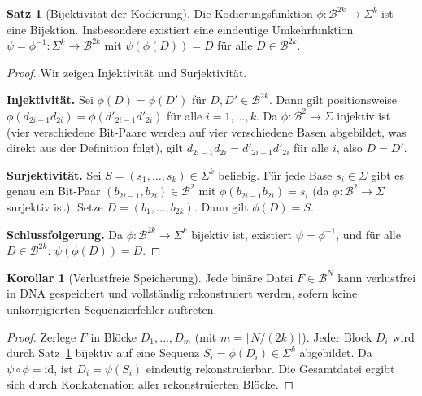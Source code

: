 ﻿\documentclass[a4paper,12pt]{article}
\theoremstyle{definition}
\newtheorem{satz}{Satz}
\newtheorem{korollar}{Korollar}
\begin{document}
\begin{satz}[Bijektivit\"{a}t der Kodierung]
    \label{satz:kodierung}
    Die Kodierungsfunktion $\phi: \mathcal{B}^{2k} \to \Sigma^k$ ist eine
    Bijektion. Insbesondere existiert eine eindeutige Umkehrfunktion
    $\psi = \phi^{-1}: \Sigma^k \to \mathcal{B}^{2k}$ mit
    $\psi(\phi(D)) = D$ f\"{u}r alle $D \in \mathcal{B}^{2k}$.
\end{satz}

\begin{proof}
    Wir zeigen Injektivit\"{a}t und Surjektivit\"{a}t.

    \textbf{Injektivit\"{a}t.}
    Sei $\phi(D) = \phi(D')$ f\"{u}r $D, D' \in \mathcal{B}^{2k}$.
    Dann gilt positionsweise $\phi(d_{2i-1} d_{2i}) = \phi(d'_{2i-1} d'_{2i})$
    f\"{u}r alle $i = 1, \ldots, k$.
    Da $\phi: \mathcal{B}^2 \to \Sigma$ injektiv ist (vier verschiedene
    Bit-Paare werden auf vier verschiedene Basen abgebildet, was direkt aus
    der Definition folgt), gilt $d_{2i-1} d_{2i} = d'_{2i-1} d'_{2i}$
    f\"{u}r alle $i$, also $D = D'$.

    \textbf{Surjektivit\"{a}t.}
    Sei $S = (s_1, \ldots, s_k) \in \Sigma^k$ beliebig.
    F\"{u}r jede Base $s_i \in \Sigma$ gibt es genau ein Bit-Paar
    $(b_{2i-1}, b_{2i}) \in \mathcal{B}^2$ mit $\phi(b_{2i-1} b_{2i}) = s_i$
    (da $\phi: \mathcal{B}^2 \to \Sigma$ surjektiv ist).
    Setze $D = (b_1, \ldots, b_{2k})$. Dann gilt $\phi(D) = S$.

    \textbf{Schlussfolgerung.}
    Da $\phi: \mathcal{B}^{2k} \to \Sigma^k$ bijektiv ist, existiert
    $\psi = \phi^{-1}$, und f\"{u}r alle $D \in \mathcal{B}^{2k}$:
    $\psi(\phi(D)) = D$. 
\end{proof}

\begin{korollar}[Verlustfreie Speicherung]
    \label{kor:verlustfrei}
    Jede bin\"{a}re Datei $F \in \mathcal{B}^N$ kann verlustfrei in
    DNA gespeichert und vollst\"{a}ndig rekonstruiert werden, sofern
    keine unkorrjigierten Sequenzierfehler auftreten.
\end{korollar}

\begin{proof}
    Zerlege $F$ in Bl\"{o}cke $D_1, \ldots, D_m$ (mit $m = \lceil N/(2k) \rceil$).
    Jeder Block $D_i$ wird durch Satz~\ref{satz:kodierung} bijektiv auf
    eine Sequenz $S_i = \phi(D_i) \in \Sigma^k$ abgebildet.
    Da $\psi \circ \phi = \mathrm{id}$, ist $D_i = \psi(S_i)$ eindeutig
    rekonstruierbar. Die Gesamtdatei ergibt sich durch Konkatenation
    aller rekonstruierten Bl\"{o}cke. 
\end{proof}
\end{document}
